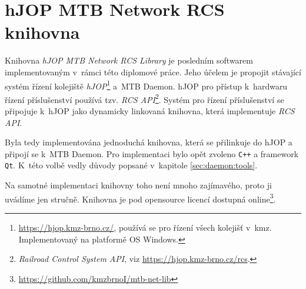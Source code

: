 \newpage
\section{hJOP MTB Network RCS knihovna} \label{sec:mtb-net-lib}

Knihovna \textit{hJOP MTB Network RCS Library} je posledním softwarem implementovaným
v~rámci této diplomové práce. Jeho účelem je propojit stávající systém řízení
kolejiště \textit{hJOP}\footnote{\url{https://hjop.kmz-brno.cz/}, používá se
pro řízení všech kolejišť v~\gls{kmz}. Implementovaný na platformě OS Windows.}
a~MTB Daemon. hJOP pro přístup k~hardwaru řízení
příslušenství používá tzv. \textit{RCS API}\footnote{\textit{Railroad Control
System API}, viz \url{https://hjop.kmz-brno.cz/rcs}.}. Systém pro řízení
příslušenství se připojuje k~hJOP jako dynamicky linkovaná knihovna,
která implementuje \textit{RCS API}.

Byla tedy implementována jednoduchá knihovna, která se přilinkuje do
hJOP a připojí se k~MTB Daemon. Pro implementaci bylo
opět zvoleno \texttt{C++} a framework \texttt{Qt}. K~této volbě vedly důvody
popsané v~kapitole \ref{sec:daemon:tools}.

Na samotné implementaci knihovny toho není mnoho zajímavého, proto ji uvádíme
jen stručně. Knihovna je pod opensource licencí dostupná
online\footnote{\url{https://github.com/kmzbrnoI/mtb-net-lib}}.
